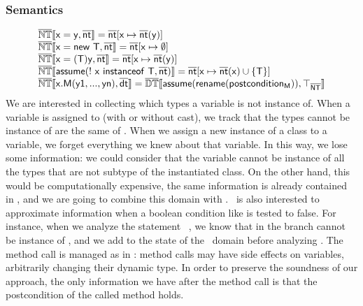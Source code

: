 \documentclass{llncs}
\begin{document}
\subsubsection{Semantics}
\[
\begin{array}{l}
\mathbb{\overline{\mathit{\mathbb{NT}}}}\llbracket \mathtt{\mathsf{x=y}, \mathsf{\overline{nt}}} \rrbracket=\mathsf{\overline{nt}}[\mathsf{x} \mapsto \mathsf{\overline{nt}}(\mathsf{y})]\\
\mathbb{\overline{\mathit{\mathbb{NT}}}}\llbracket \mathtt{\mathsf{x=new\ T}, \mathsf{\overline{nt}}} \rrbracket=\mathsf{\overline{nt}}[\mathsf{x} \mapsto \emptyset]\\
\mathbb{\overline{\mathit{\mathbb{NT}}}}\llbracket \mathtt{\mathsf{x=(T) y}, \mathsf{\overline{nt}}} \rrbracket=\mathsf{\overline{nt}}[\mathsf{x} \mapsto \mathsf{\overline{nt}}(\mathsf{y})]\\
\mathbb{\overline{\mathit{\mathbb{NT}}}}\llbracket \mathtt{\mathsf{assume(!\ x\ instanceof\ T}, \mathsf{\overline{nt}})} \rrbracket=\mathsf{\overline{nt}}[\mathsf{x} \mapsto \mathsf{\overline{nt}}(\mathsf{x}) \cup \{\mathsf{T}\}]\\
\mathbb{\overline{\mathit{\mathbb{NT}}}}\llbracket \mathtt{\mathsf{x.M(y1, ..., yn)}, \mathsf{\overline{dt}}} \rrbracket=\mathbb{\overline{\mathit{\mathbb{DT}}}}\llbracket \mathtt{\mathsf{assume(rename(postcondition_M))}, \top_{\mathsf{\overline{NT}}}} \rrbracket\\
\end{array}
\]
We are interested in collecting which types a variable is not instance of. When a variable  is assigned to  (with or without cast), we track that the types  cannot be instance of are the same of . When we assign a new instance of a class to a variable, we forget everything we knew about that variable. In this way, we lose some information: we could consider that the variable cannot be instance of all the types that are not subtype of the instantiated class. On the other hand, this would be computationally expensive, the same information is already contained in \dynamictype, and we are going to combine this domain with \nottype. \nottype\ is also interested to approximate information when a boolean condition like  is tested to false. For instance, when we analyze the  statement \ \allowbreak{}, we know that in the  branch  cannot be instance of , and we add  to the state of the \nottype\ domain before analyzing . The method call is managed as in \dynamictype: method calls may have side effects on variables, arbitrarily changing their dynamic type. In order to preserve the soundness of our approach, the only information we have after the method call is that the postcondition of the called method holds.
\end{document}

